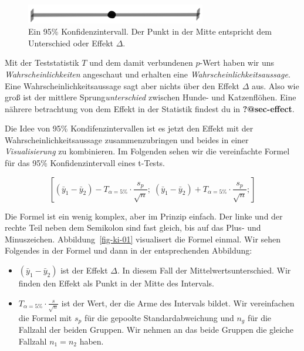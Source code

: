 \documentclass[
  letterpaper,
  DIV=11,
  oneside]{scrreport}
\providecommand{\tightlist}{%
  \setlength{\itemsep}{0pt}\setlength{\parskip}{0pt}}\usepackage{longtable,booktabs,array}
\begin{document}
\begin{figure}

{\centering \includegraphics[width=0.7\textwidth,height=\textheight]{./images/ci-00.png}

}

\caption{\label{fig-ki-00}Ein 95\% Konfidenzintervall. Der Punkt in der
Mitte entspricht dem Unterschied oder Effekt \(\Delta\).}

\end{figure}

{}

Mit der Teststatistik \(T\) und dem damit verbundenen \(p\)-Wert haben
wir uns \emph{Wahrscheinlichkeiten} angeschaut und erhalten eine
\emph{Wahrscheinlichkeitsaussage}. Eine Wahrscheinlichkeitsaussage sagt
aber nichts über den Effekt \(\Delta\) aus. Also wie groß ist der
mittlere Sprung\emph{unterschied} zwischen Hunde- und Katzenflöhen. Eine
nährere betrachtung von dem Effekt in der Statistik findest du in
\textbf{?@sec-effect}.

Die Idee von 95\% Kondifenzintervallen ist es jetzt den Effekt mit der
Wahrscheinlichkeitsaussage zusammenzubringen und beides in einer
\emph{Visualisierung} zu kombinieren. Im Folgenden sehen wir die
vereinfachte Formel für das 95\% Konfidenzintervall eines t-Tests.

\[
\left[
(\bar{y}_1-\bar{y}_2) - 
T_{\alpha = 5\%} \cdot \frac {s_p}{\sqrt{n}}; \;
(\bar{y}_1-\bar{y}_2) + 
T_{\alpha = 5\%} \cdot \frac {s_p}{\sqrt{n}};
\right]
\]

Die Formel ist ein wenig komplex, aber im Prinzip einfach. Der linke und
der rechte Teil neben dem Semikolon sind fast gleich, bis auf das Plus-
und Minuszeichen. Abbildung~\ref{fig-ki-01} visualisert die Formel
einmal. Wir sehen Folgendes in der Formel und dann in der entsprechenden
Abbildung:

\begin{itemize}
\tightlist
\item
  \((\bar{y}_{1}-\bar{y}_{2})\) ist der Effekt \(\Delta\). In diesem
  Fall der Mittelwertsunterschied. Wir finden den Effekt als Punkt in
  der Mitte des Intervals.
\item
  \(T_{\alpha = 5\%} \cdot \frac {s}{\sqrt{n}}\) ist der Wert, der die
  Arme des Intervals bildet. Wir vereinfachen die Formel mit \(s_p\) für
  die gepoolte Standardabweichung und \(n_g\) für die Fallzahl der
  beiden Gruppen. Wir nehmen an das beide Gruppen die gleiche Fallzahl
  \(n_1 = n_2\) haben.
\end{itemize}
\end{document}
